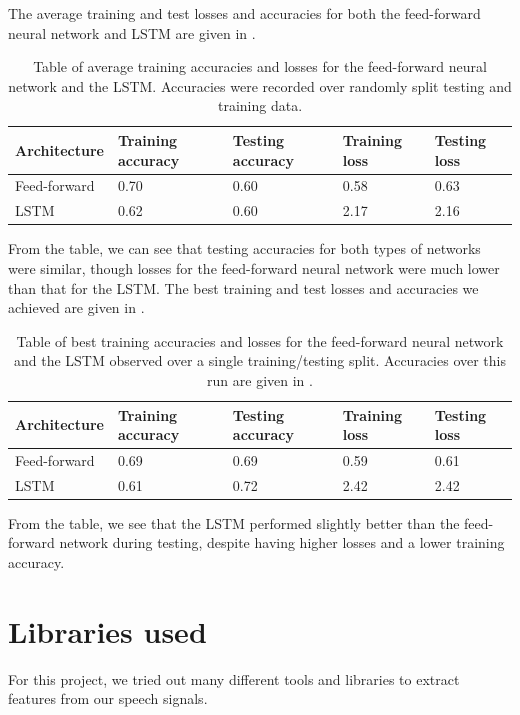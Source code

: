 \documentclass{article}
\begin{document}
The average training and test losses and accuracies for both the feed-forward neural network and LSTM are given in .
\begin{table}[ht]
	\centering
	\begin{tabularx}{\linewidth}{|X|X|X|X|X|}
		\hline
		Ar\-chi\-tec\-ture & Training accuracy & Testing accuracy & Training loss & Testing loss \\
		\hline
		Feed-forward & 0.70 & 0.60 & 0.58 & 0.63 \\
		\hline
		LSTM & 0.62 & 0.60 & 2.17 & 2.16 \\
		\hline
	\end{tabularx}
	\caption{Table of average training accuracies and losses for the feed-forward neural network and the LSTM. Accuracies were recorded over randomly split testing and training data.}
	\label{tab:avg_acc}
\end{table}
From the table, we can see that testing accuracies for both types of networks were similar, though losses for the feed-forward neural network were much lower than that for the LSTM.
The best training and test losses and accuracies we achieved are given in .
\begin{table}[!ht]
	\centering
	\begin{tabularx}{\linewidth}{|X|X|X|X|X|}
		\hline
		Ar\-chi\-tec\-ture & Training accuracy & Testing accuracy & Training loss & Testing loss \\
		\hline
		Feed-forward & 0.69 & 0.69 & 0.59 & 0.61 \\
		\hline
		LSTM & 0.61 & 0.72 & 2.42 & 2.42 \\
		\hline
	\end{tabularx}
	\caption{Table of best training accuracies and losses for the feed-forward neural network and the LSTM observed over a single training/testing split. Accuracies over this run are given in .}
	\label{tab:best_acc}
\end{table}
From the table, we see that the LSTM performed slightly better than the feed-forward network during testing, despite having higher losses and a lower training accuracy.

\section{Libraries used}
\label{sec:libraries}

For this project, we tried out many different tools and libraries to extract features from our speech signals.
\end{document}
